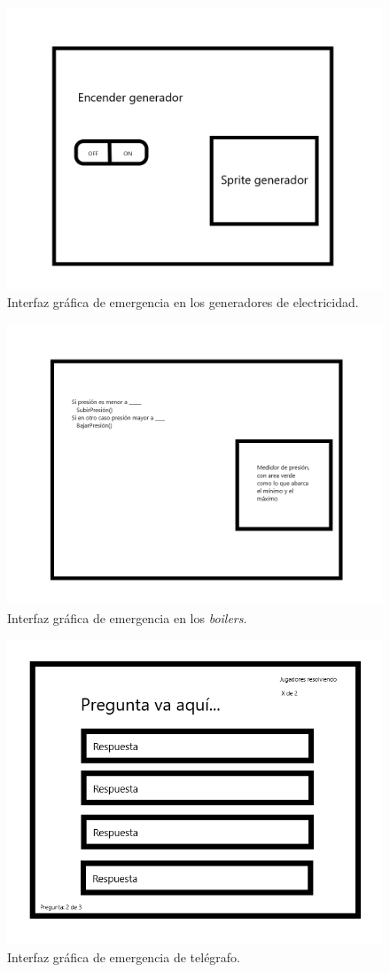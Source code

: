     \begin{figure}[H]
        \centering
        \includegraphics[width=0.5\linewidth]{images/SabotageGenerador.png}
        \caption{Interfaz gráfica de emergencia en los generadores de electricidad.}
        \label{fig:ui_sab_generador}
    \end{figure}
        \begin{figure}[H]
        \centering
        \includegraphics[width=0.5\linewidth]{images/SabotagePresion.png}
        \caption{Interfaz gráfica de emergencia en los \textit{boilers}.}
        \label{fig:ui_sab_presion}
    \end{figure}
        \begin{figure}[H]
        \centering
        \includegraphics[width=0.5\linewidth]{images/sabotage_preguntas.png}
        \caption{Interfaz gráfica de emergencia de telégrafo.}
        \label{fig:ui_teletransporte}
    \end{figure}

